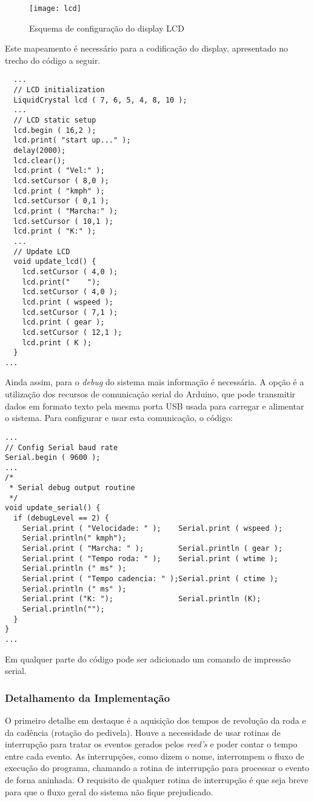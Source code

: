 \documentclass[a4paper,11pt]{article}
\begin{document}
\begin{figure}[h!]
\begin{center}
  \texttt{[image: lcd]}
\end{center}
  \caption{Esquema de configuração do display LCD}
  \label{fig:schemalcd}
\end{figure}

Este mapeamento é necessário para a codificação do display, apresentado no
trecho do código a seguir.
\begin{lstlisting}
  ...
  // LCD initialization
  LiquidCrystal lcd ( 7, 6, 5, 4, 8, 10 );
  ...
  // LCD static setup
  lcd.begin ( 16,2 );
  lcd.print( "start up..." );
  delay(2000);
  lcd.clear();
  lcd.print ( "Vel:" );
  lcd.setCursor ( 8,0 );
  lcd.print ( "kmph" );
  lcd.setCursor ( 0,1 );
  lcd.print ( "Marcha:" );
  lcd.setCursor ( 10,1 );
  lcd.print ( "K:" );
  ...
  // Update LCD
  void update_lcd() {
    lcd.setCursor ( 4,0 );
    lcd.print("    ");
    lcd.setCursor ( 4,0 );
    lcd.print ( wspeed );
    lcd.setCursor ( 7,1 );
    lcd.print ( gear );
    lcd.setCursor ( 12,1 );
    lcd.print ( K );
  }
...
\end{lstlisting}

Ainda assim, para o \textit{debug} do sistema mais informação é necessária. A
opção é a utilização dos recursos de comunicação serial do Arduino, que pode
transmitir dados em formato texto pela mesma porta USB usada para carregar e
alimentar o sistema. Para configurar e usar esta comunicação, o código:

\begin{lstlisting}
...
// Config Serial baud rate
Serial.begin ( 9600 );
...
/*
 * Serial debug output routine
 */
void update_serial() {
  if (debugLevel == 2) {
    Serial.print ( "Velocidade: " );    Serial.print ( wspeed );
    Serial.println(" kmph");
    Serial.print ( "Marcha: " );        Serial.println ( gear );
    Serial.print ( "Tempo roda: " );    Serial.print ( wtime );
    Serial.println (" ms" );
    Serial.print ( "Tempo cadencia: " );Serial.print ( ctime );
    Serial.println (" ms" );
    Serial.print ("K: ");               Serial.println (K);
    Serial.println("");
  }
}
...
\end{lstlisting}

Em qualquer parte do código pode ser adicionado um comando de impressão serial.

\subsubsection{Detalhamento da Implementação}
\label{sec:code_detail}
O primeiro detalhe em destaque é a aquisição dos tempos de revolução da roda e
da cadência (rotação do pedivela). Houve a necessidade de usar rotinas de
interrupção para tratar os eventos gerados pelos \textit{reed's} e poder contar
o tempo entre cada evento. As interrupções, como dizem o nome, interrompem o
fluxo de execução do programa, chamando a rotina de interrupção para processar
o evento de forna aninhada. O requisito de qualquer rotina de interrupção é que
seja breve para que o fluxo geral do sistema não fique prejudicado.
\end{document}

